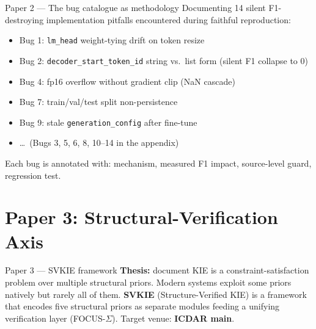 \documentclass{beamer}
\begin{document}
\begin{frame}{Paper 2 --- The bug catalogue as methodology}
  Documenting 14 silent F1-destroying implementation pitfalls
  encountered during faithful reproduction:
  \begin{itemize}
    \item Bug 1: \texttt{lm\_head} weight-tying drift on token resize
    \item Bug 2: \texttt{decoder\_start\_token\_id} string vs.\ list
          form (silent F1 collapse to 0)
    \item Bug 4: fp16 overflow without gradient clip (NaN cascade)
    \item Bug 7: train/val/test split non-persistence
    \item Bug 9: stale \texttt{generation\_config} after fine-tune
    \item \dots\ (Bugs 3, 5, 6, 8, 10--14 in the appendix)
  \end{itemize}
  Each bug is annotated with: mechanism, measured F1 impact,
  source-level guard, regression test.
\end{frame}

\section{Paper 3: Structural-Verification Axis}
\begin{frame}{Paper 3 --- SVKIE framework}
  \textbf{Thesis:} document KIE is a constraint-satisfaction problem
  over multiple structural priors.  Modern systems exploit some priors
  natively but rarely all of them.
  \vspace{0.5em}
  \textbf{SVKIE} (Structure-Verified KIE) is a framework that encodes
  five structural priors as separate modules feeding a unifying
  verification layer (FOCUS-$\Sigma$).
  \vspace{0.5em}
  Target venue: \textbf{ICDAR main}.
\end{frame}
\end{document}
